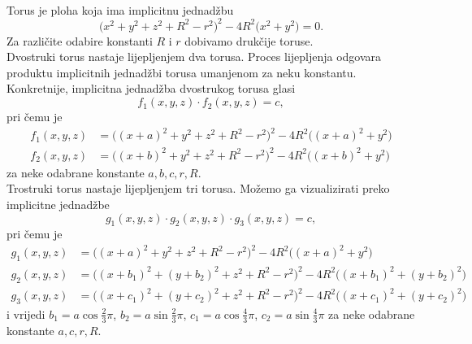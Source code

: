 \documentclass[a4paper,12pt]{article}
\theoremstyle{zad}
\begin{document}
\begin{center}
\\[2pt]
\end{center}
Torus je ploha koja ima implicitnu jednad\v{z}bu
$$\big(x^2+y^2+z^2+R^2-r^2\big)^2-4R^2\big(x^2+y^2\big)=0.$$
Za razli\v{c}ite odabire konstanti $R$ i $r$ dobivamo druk\v{c}ije toruse.\\[5pt]
Dvostruki torus nastaje lijepljenjem dva torusa. Proces lijepljenja odgovara produktu
implicitnih jednad\v{z}bi torusa umanjenom za neku konstantu. Konkretnije, implicitna
jednad\v{z}ba dvostrukog torusa glasi
$$f_1(x,y,z)\cdot f_2(x,y,z)=c,$$
pri \v{c}emu je
\begin{align*}
f_1(x,y,z)&=\big((x+a)^2+y^2+z^2+R^2-r^2\big)^2-4R^2\big((x+a)^2+y^2\big)\\
f_2(x,y,z)&=\big((x+b)^2+y^2+z^2+R^2-r^2\big)^2-4R^2\big((x+b)^2+y^2\big)
\end{align*}
za neke odabrane konstante $a,b,c,r,R$.\\[5pt]
Trostruki torus nastaje lijepljenjem tri torusa. Mo\v{z}emo ga vizualizirati preko
implicitne jednad\v{z}be
$$g_1(x,y,z)\cdot g_2(x,y,z)\cdot g_3(x,y,z)=c,$$
pri \v{c}emu je
\begin{align*}
g_1(x,y,z)&=\big((x+a)^2+y^2+z^2+R^2-r^2\big)^2-4R^2\big((x+a)^2+y^2\big)\\
g_2(x,y,z)&=\big((x+b_1)^2+(y+b_2)^2+z^2+R^2-r^2\big)^2-4R^2\big((x+b_1)^2+(y+b_2)^2\big)\\
g_3(x,y,z)&=\big((x+c_1)^2+(y+c_2)^2+z^2+R^2-r^2\big)^2-4R^2\big((x+c_1)^2+(y+c_2)^2\big)
\end{align*}
i vrijedi $b_1=a\cos{\frac{2}{3}\pi}$, $b_2=a\sin{\frac{2}{3}\pi}$, $c_1=a\cos{\frac{4}{3}\pi}$,
$c_2=a\sin{\frac{4}{3}\pi}$ za neke odabrane\vspace*{2pt} konstante $a,c,r,R$.\par
\end{document}
